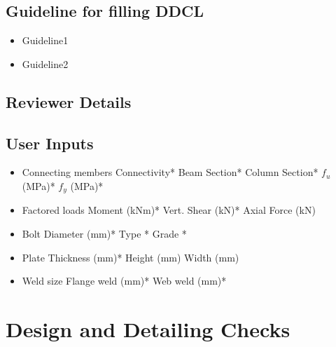 \documentclass[11.5pt,a4paper,oneside]{report}
\begin{document}
\tableofcontents
\newpage
\printglossary[type=symbolslist,style=long]

\begin{Form}
\chapter*{Guideline for filling DDCL}
	\begin{itemize}
			\item    Guideline1
			\item    Guideline2
	\end{itemize}
\chapter*{Reviewer Details}

\chapter*{User Inputs}
%
\begin{itemize}
	\item Connecting members
		\subitem Connectivity*
		\subitem Beam Section*
		\subitem Column Section*
		\subitem $f_u$ (MPa)* 
		\subitem $f_y$ (MPa)* 
	\item Factored loads
		\subitem Moment (kNm)*
		\subitem Vert. Shear (kN)*
		\subitem Axial Force (kN)
	\item Bolt
		\subitem Diameter (mm)*
		\subitem Type *
		\subitem Grade *
	\item Plate
		\subitem Thickness (mm)*
		\subitem Height (mm)
		\subitem Width (mm)
	\item Weld size
		\subitem Flange weld (mm)*
		\subitem Web weld (mm)*
\end{itemize}
\part*{Design and Detailing Checks}

\end{Form}
\end{document}
